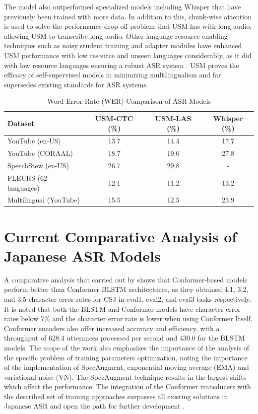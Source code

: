 The model also outperformed specialized models including Whisper that have previously been trained with more data. In addition to this, chunk-wise attention is used to solve the performance drop-off problem that USM has with long audio, allowing USM to transcribe long audio. Other language resource enabling techniques such as noisy student training and adapter modules have enhanced USM performance with low resource and unseen languages considerably, as it did with low resource languages ensuring a robust ASR system \parencite{zhang2023google}. USM proves the efficacy of self-supervised models in minimizing multilingualism and far supersedes existing standards for ASR systems.
\begin{table}[H]
    \centering
    \caption{Word Error Rate (WER) Comparison of ASR Models}
    \begin{tabular}{|l|c|c|c|}
    \hline
    \textbf{Dataset}        & \textbf{USM-CTC (\%)} & \textbf{USM-LAS (\%)} & \textbf{Whisper (\%)} \\ \hline
    YouTube (en-US)         & 13.7                  & 14.4                  & 17.7                 \\ \hline
    YouTube (CORAAL)        & 18.7                  & 19.0                  & 27.8                 \\ \hline
    SpeechStew (en-US)      & 26.7                  & 29.8                  & -                    \\ \hline
    FLEURS (62 languages)   & 12.1                  & 11.2                  & 13.2                 \\ \hline
    Multilingual (YouTube)  & 15.5                  & 12.5                  & 23.9                 \\ \hline
    \end{tabular}
    \label{tab:wer_comparison}
    \end{table}

\section{Current Comparative Analysis of Japanese ASR Models}
A comparative analysis that carried out by \textcite{Karita2021} shows that Conformer-based models perform better than Conformer BLSTM architectures, as they obtained 4.1, 3.2, and 3.5 character error rates for CSJ in eval1, eval2, and eval3 tasks respectively. It is noted that both the BLSTM and Conformer models have character error rates below 7\% and the character error rate is lower when using Conformer Itself. Conformer encoders also offer increased accuracy and efficiency, with a throughput of 628.4 utterances processed per second and 430.0 for the BLSTM models. The scope of the work also emphasizes the importance of the analysis of the specific problem of training parameters optimization, noting the importance of the implementation of SpecAugment, exponential moving average (EMA) and variational noise (VN). The SpecAugment technique results in the largest shifts which affect the performance. The integration of the Conformer transducers with the described set of training approaches surpasses all existing solutions in Japanese ASR and open the path for further development \parencite{Karita2021}.

